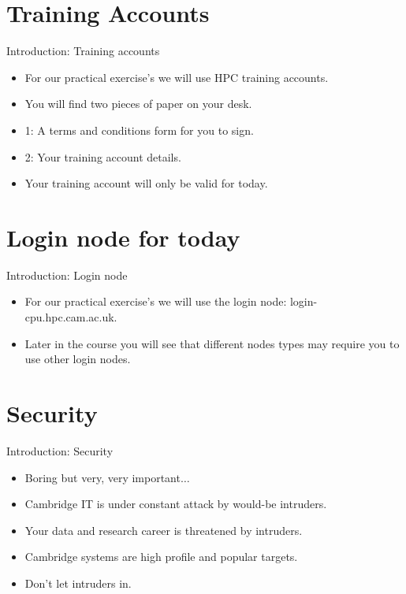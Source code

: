 \section{Training Accounts}
\begin{frame}{Introduction: Training accounts}
\begin{itemize}
\item{\alert{For our practical exercise's we will use HPC training accounts.}}
\pause
\item{You will find two pieces of paper on your desk.}
\pause
\item{1: A terms and conditions form for you to sign.}
\pause
\item{2: Your training account details.}
\pause
\item{Your training account will only be valid for today.}
\end{itemize}
\end{frame}

\section{Login node for today}
\begin{frame}{Introduction: Login node}
\begin{itemize}
\item{\alert{For our practical exercise's we will use the login node: login-cpu.hpc.cam.ac.uk.}}
\pause
\item{Later in the course you will see that different nodes types may require you to use other login nodes.}
\end{itemize}
\end{frame}

\section{Security}
\begin{frame}{Introduction: Security}
\begin{itemize}
\item{\alert{Boring but very, very important${}\ldots$}}
\pause
\item{Cambridge IT is under constant attack by would-be intruders.}
\pause
\item{Your data and research career is threatened by intruders.}
\pause
\item{\alert{Cambridge systems} are high profile and popular targets.}
\pause
\item{\alert{Don't let intruders in.}}
\end{itemize}
\end{frame}

